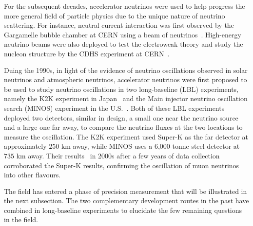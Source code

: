 For the subsequent decades, accelerator neutrinos were used to help progress the more general field of particle physics due to the unique nature of neutrino scattering.
For instance, neutral current interaction was first observed by the Gargamelle bubble chamber at CERN using a beam of neutrinos~\cite{GargamelleNeutrino:1973jyy}.
High-energy neutrino beams were also deployed to test the electroweak theory and study the nucleon structure by the CDHS experiment at CERN~\cite{Schlatter:2015nxk}.

Duing the 1990s, in light of the evidence of neutrino oscillations observed in solar neutrinos and atmospheric neutrinos, accelerator neutrinos were first proposed to be used to study neutrino oscillations in two long-baseline (LBL) experiments, namely the K2K experiment in Japan~\cite{Wilkes:1997hm} and the Main injector neutrino oscillation search (MINOS) experiment in the U.S.~\cite{MINOS:1995txm}.
Both of these LBL experiments deployed two detectors, similar in design, a small one near the neutrino source and a large one far away, to compare the neutrino fluxes at the two locations to measure the oscillation.
The K2K experiment used Super-K as the far detector at approximately $250$ km away, while MINOS uses a 6,000-tonne steel detector at $735$ km away.
Their results~\cite{K2K:2002icj,MINOS:2006foh} in 2000s after a few years of data collection corroborated the Super-K results, confirming the oscillation of muon neutrinos into other flavours.

The field has entered a phase of precision measurement that will be illustrated in the next subsection.
The two complementary development routes in the past have combined in long-baseline experiments to elucidate the few remaining questions in the field.



